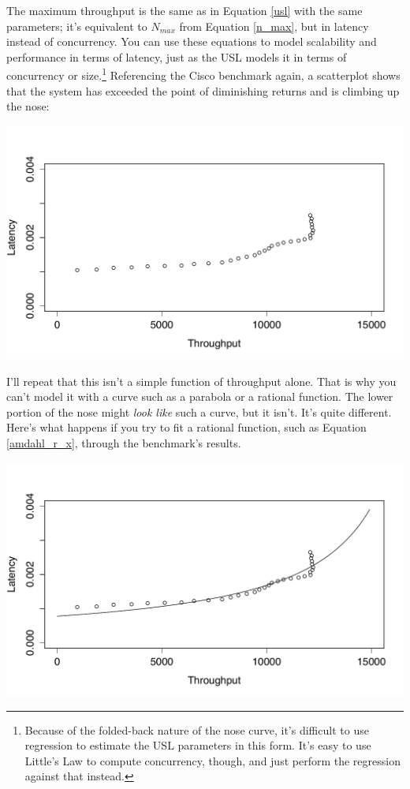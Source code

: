 \documentclass{vivid_layout}
\begin{document}
The maximum throughput is the same as in Equation \ref{usl} with the same
parameters; it's equivalent to $N_{max}$ from Equation \ref{n_max}, but in
latency instead of concurrency.  You can use these equations to model
scalability and performance in terms of latency, just as the USL models it in
terms of concurrency or size.\footnote{Because of the folded-back nature of the
nose curve, it's difficult to use regression to estimate the USL parameters in
this form. It's easy to use Little's Law to compute concurrency, though, and
just perform the regression against that instead.} Referencing the Cisco
benchmark again, a scatterplot shows that the system has exceeded the point of
diminishing returns and is climbing up the nose:
\begin{center}
\includegraphics[width=.85\linewidth]{scalability/not-a-function}
\end{center}

I'll repeat that this isn't a simple function of throughput alone. That is why
you can't model it with a curve such as a parabola or a rational function.
The lower portion of the nose might {\itshape look like} such a curve,
but it isn't. It's quite different.  Here's what happens if you try to fit a
rational function, such as Equation \ref{amdahl_r_x}, through the benchmark's
results.
\begin{center}
\includegraphics[width=.85\linewidth]{scalability/cisco-x-v-r-amdahl}
\end{center}
\end{document}
